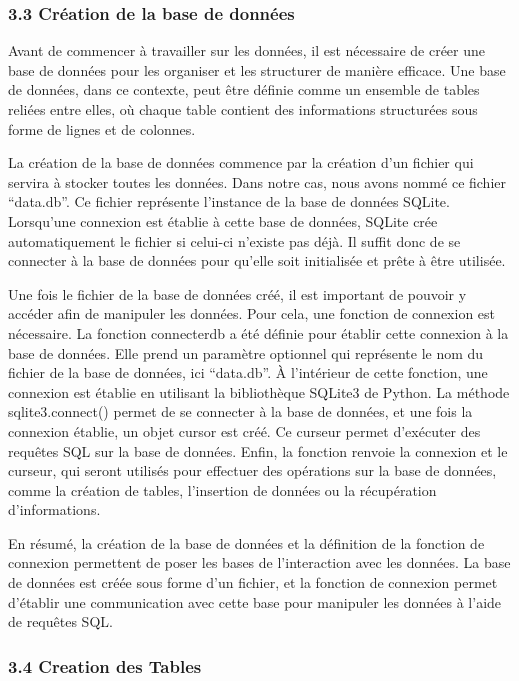 \documentclass[
]{article}
\begin{document}
\subsubsection{3.3 Création de la base de
données}\label{cruxe9ation-de-la-base-de-donnuxe9es}

Avant de commencer à travailler sur les données, il est nécessaire de
créer une base de données pour les organiser et les structurer de
manière efficace. Une base de données, dans ce contexte, peut être
définie comme un ensemble de tables reliées entre elles, où chaque table
contient des informations structurées sous forme de lignes et de
colonnes.

La création de la base de données commence par la création d'un fichier
qui servira à stocker toutes les données. Dans notre cas, nous avons
nommé ce fichier ``data.db''. Ce fichier représente l'instance de la
base de données SQLite. Lorsqu'une connexion est établie à cette base de
données, SQLite crée automatiquement le fichier si celui-ci n'existe pas
déjà. Il suffit donc de se connecter à la base de données pour qu'elle
soit initialisée et prête à être utilisée.

Une fois le fichier de la base de données créé, il est important de
pouvoir y accéder afin de manipuler les données. Pour cela, une fonction
de connexion est nécessaire. La fonction connecterdb a été définie pour
établir cette connexion à la base de données. Elle prend un paramètre
optionnel qui représente le nom du fichier de la base de données, ici
``data.db''. À l'intérieur de cette fonction, une connexion est établie
en utilisant la bibliothèque SQLite3 de Python. La méthode
sqlite3.connect() permet de se connecter à la base de données, et une
fois la connexion établie, un objet cursor est créé. Ce curseur permet
d'exécuter des requêtes SQL sur la base de données. Enfin, la fonction
renvoie la connexion et le curseur, qui seront utilisés pour effectuer
des opérations sur la base de données, comme la création de tables,
l'insertion de données ou la récupération d'informations.

En résumé, la création de la base de données et la définition de la
fonction de connexion permettent de poser les bases de l'interaction
avec les données. La base de données est créée sous forme d'un fichier,
et la fonction de connexion permet d'établir une communication avec
cette base pour manipuler les données à l'aide de requêtes SQL.

\subsubsection{3.4 Creation des Tables}\label{creation-des-tables}
\end{document}
